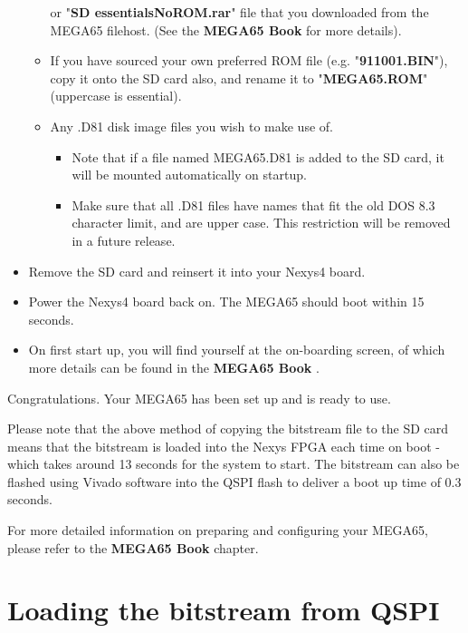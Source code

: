 \begin{itemize}
\begin{itemize}
	      or "\textbf{SD essentialsNoROM.rar}" file that you downloaded from
		  the MEGA65 filehost. (See
\ifdefined\printmanual
the {\bf MEGA65 Book}
\else
{}
\fi
		  for more details).
    \item{If you have sourced your own preferred ROM file} (e.g. "\textbf{911001.BIN}"), copy it onto the SD card also, and rename it to "\textbf{MEGA65.ROM}" (uppercase is essential).
    \item{Any .D81 disk image files} you wish to make use of.
      \begin{itemize}
        \item Note that if a file named MEGA65.D81 is added to the SD card, it will be mounted automatically on startup.
        \item Make sure that all .D81 files have names that fit the old DOS 8.3 character limit, and are upper case.  This restriction will be removed in a future release.
      \end{itemize}
  \end{itemize}
\item{Remove the SD card} and reinsert it into your Nexys4 board.
\item{Power the Nexys4} board back on.  The MEGA65 should boot within 15 seconds.
\item On first start up, you will find yourself at the on-boarding screen, of which more
    details can be found in
\ifdefined\printmanual
the {\bf MEGA65 Book}
\else
{}
\fi
.

\end{itemize}

Congratulations. Your MEGA65 has been set up and is ready to use.

Please note that the above method of copying the bitstream file to the SD card means that the bitstream is loaded into the Nexys FPGA each time on boot - which takes around 13 seconds for the system to start. The bitstream can also be flashed using Vivado software into the QSPI flash to deliver a boot up time of 0.3 seconds.

For more detailed information on preparing and configuring your MEGA65, please refer
to
\ifdefined\printmanual
the {\bf MEGA65 Book}
\else
{}
\fi
chapter.

\section{Loading the bitstream from QSPI}

